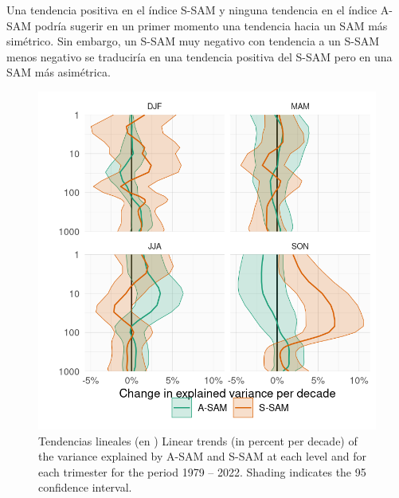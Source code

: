 \documentclass[12pt,oneside]{reedthesis}
\begin{document}
Una tendencia positiva en el índice S-SAM y ninguna tendencia en el índice A-SAM podría sugerir en un primer momento una tendencia hacia un SAM más simétrico.
Sin embargo, un S-SAM muy negativo con tendencia a un S-SAM menos negativo se traduciría en una tendencia positiva del S-SAM pero en una SAM más asimétrica.





\begin{figure}
\includegraphics{figures/30-sam/r-squared-trend-1} \caption{Tendencias lineales (en )
Linear trends (in percent per decade) of the variance explained by A-SAM and S-SAM at each level and for each trimester for the period 1979 -- 2022.
Shading indicates the 95 confidence interval.}\label{fig:r-squared-trend}
\end{figure}

\end{document}
